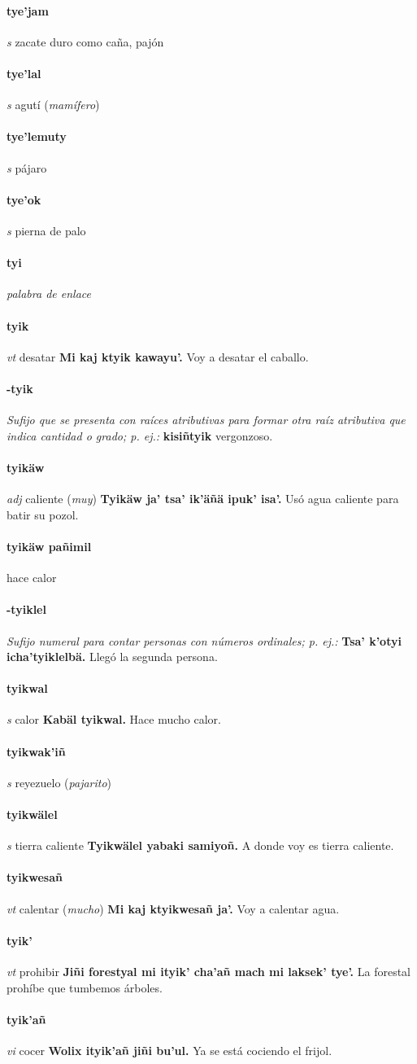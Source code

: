 \documentclass{scrbook}
\newcommand{\entry}[1]{\paragraph{#1}}
\newcommand{\nontranslationdef}[1]{\textit{#1}}
\newcommand{\partofspeech}[1]{\textit{#1}}
\newcommand{\spanishtranslation}[1]{#1}
\newcommand{\clarification}[1]{(\textit{#1})}
\newcommand{\cholexample}[1]{\textbf{#1}}
\newcommand{\exampletranslation}[1]{#1}
\begin{document}
\begin{multicols}{2}
\entry{tye'jam}
\partofspeech{s}
\spanishtranslation{zacate duro como caña, pajón}

\entry{tye'lal}
\partofspeech{s}
\spanishtranslation{agutí}
\clarification{mamífero}

\entry{tye'lemuty}
\partofspeech{s}
\spanishtranslation{pájaro}

\entry{tye'ok}
\partofspeech{s}
\spanishtranslation{pierna de palo}

\entry{tyi}
\nontranslationdef{palabra de enlace}

\entry{tyik}
\partofspeech{vt}
\spanishtranslation{desatar}
\cholexample{Mi kaj ktyik kawayu'.}
\exampletranslation{Voy a desatar el caballo.}

\entry{-tyik}
\nontranslationdef{Sufijo que se presenta con raíces atributivas para formar otra raíz atributiva que indica cantidad o grado; p. ej.:}
\cholexample{kisiñtyik}
\exampletranslation{vergonzoso.}

\entry{tyikäw}
\partofspeech{adj}
\spanishtranslation{caliente}
\clarification{muy}
\cholexample{Tyikäw ja' tsa' ik'äñä ipuk' isa'.}
\exampletranslation{Usó agua caliente para batir su pozol.}

\entry{tyikäw pañimil}
\spanishtranslation{hace calor}

\entry{-tyiklel}
\nontranslationdef{Sufijo numeral para contar personas con números ordinales; p. ej.:}
\cholexample{Tsa' k'otyi icha'tyiklelbä.}
\exampletranslation{Llegó la segunda persona.}

\entry{tyikwal}
\partofspeech{s}
\spanishtranslation{calor}
\cholexample{Kabäl tyikwal.}
\exampletranslation{Hace mucho calor.}

\entry{tyikwak'iñ}
\partofspeech{s}
\spanishtranslation{reyezuelo}
\clarification{pajarito}

\entry{tyikwälel}
\partofspeech{s}
\spanishtranslation{tierra caliente}
\cholexample{Tyikwälel yabaki samiyoñ.}
\exampletranslation{A donde voy es tierra caliente.}

\entry{tyikwesañ}
\partofspeech{vt}
\spanishtranslation{calentar}
\clarification{mucho}
\cholexample{Mi kaj ktyikwesañ ja'.}
\exampletranslation{Voy a calentar agua.}

\entry{tyik'}
\partofspeech{vt}
\spanishtranslation{prohibir}
\cholexample{Jiñi forestyal mi ityik' cha'añ mach mi laksek' tye'.}
\exampletranslation{La forestal prohíbe que tumbemos árboles.}

\entry{tyik'añ}
\partofspeech{vi}
\spanishtranslation{cocer}
\cholexample{Wolix ityik'añ jiñi bu'ul.}
\exampletranslation{Ya se está cociendo el frijol.}


\end{multicols}
\end{document}
